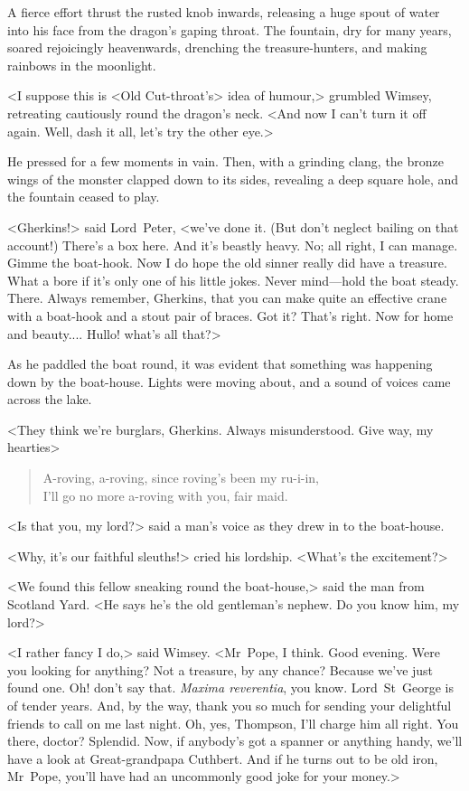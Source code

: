 A fierce effort thrust the rusted knob inwards, releasing a huge spout of water into his face from the dragon's gaping throat. The fountain, dry for many years, soared rejoicingly heavenwards, drenching the treasure-hunters, and making rainbows in the moonlight.

<I suppose this is <Old Cut-throat's> idea of humour,> grumbled Wimsey, retreating cautiously round the dragon's neck. <And now I can't turn it off again. Well, dash it all, let's try the other eye.>

He pressed for a few moments in vain. Then, with a grinding clang, the bronze wings of the monster clapped down to its sides, revealing a deep square hole, and the fountain ceased to play.

<Gherkins!> said Lord~Peter, <we've done it. (But don't neglect bailing on that account!) There's a box here. And it's beastly heavy. No; all right, I can manage. Gimme the boat-hook. Now I do hope the old sinner really did have a treasure. What a bore if it's only one of his little jokes. Never mind—hold the boat steady. There. Always remember, Gherkins, that you can make quite an effective crane with a boat-hook and a stout pair of braces. Got it? That's right. Now for home and beauty.... Hullo! what's all that?>

As he paddled the boat round, it was evident that something was happening down by the boat-house. Lights were moving about, and a sound of voices came across the lake.

<They think we're burglars, Gherkins. Always misunderstood. Give way, my hearties\longdash>

\begin{quote}
A-roving, a-roving, since roving's been my ru-i-in,\\
I'll go no more a-roving with you, fair maid.
\end{quote}

<Is that you, my lord?> said a man's voice as they drew in to the boat-house.

<Why, it's our faithful sleuths!> cried his lordship. <What's the excitement?>

<We found this fellow sneaking round the boat-house,> said the man from Scotland Yard. <He says he's the old gentleman's nephew. Do you know him, my lord?>

<I rather fancy I do,> said Wimsey. <Mr~Pope, I think. Good evening. Were you looking for anything? Not a treasure, by any chance? Because we've just found one. Oh! don't say that. \textit{Maxima reverentia}, you know. Lord~St~George is of tender years. And, by the way, thank you so much for sending your delightful friends to call on me last night. Oh, yes, Thompson, I'll charge him all right. You there, doctor? Splendid. Now, if anybody's got a spanner or anything handy, we'll have a look at Great-grandpapa Cuthbert. And if he turns out to be old iron, Mr~Pope, you'll have had an uncommonly good joke for your money.>

